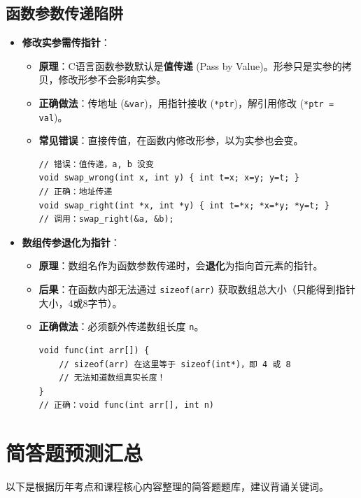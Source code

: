 \documentclass[a4paper,12pt]{article}
\begin{document}
\subsection{函数参数传递陷阱}
\begin{itemize}
    \item \textbf{修改实参需传指针}：
    \begin{itemize}
        \item \textbf{原理}：C语言函数参数默认是\textbf{值传递} (Pass by Value)。形参只是实参的拷贝，修改形参不会影响实参。
        \item \textbf{正确做法}：传地址 (\texttt{\&var})，用指针接收 (\texttt{*ptr})，解引用修改 (\texttt{*ptr = val})。
        \item \textbf{常见错误}：直接传值，在函数内修改形参，以为实参也会变。
\begin{lstlisting}
// 错误：值传递，a, b 没变
void swap_wrong(int x, int y) { int t=x; x=y; y=t; }
// 正确：地址传递
void swap_right(int *x, int *y) { int t=*x; *x=*y; *y=t; }
// 调用：swap_right(&a, &b);
\end{lstlisting}
    \end{itemize}

    \item \textbf{数组传参退化为指针}：
    \begin{itemize}
        \item \textbf{原理}：数组名作为函数参数传递时，会\textbf{退化}为指向首元素的指针。
        \item \textbf{后果}：在函数内部无法通过 \texttt{sizeof(arr)} 获取数组总大小（只能得到指针大小，4或8字节）。
        \item \textbf{正确做法}：必须额外传递数组长度 \texttt{n}。
\begin{lstlisting}
void func(int arr[]) {
    // sizeof(arr) 在这里等于 sizeof(int*)，即 4 或 8
    // 无法知道数组真实长度！
}
// 正确：void func(int arr[], int n)
\end{lstlisting}
    \end{itemize}
\end{itemize}

\section{简答题预测汇总}

以下是根据历年考点和课程核心内容整理的简答题题库，建议背诵关键词。
\end{document}
